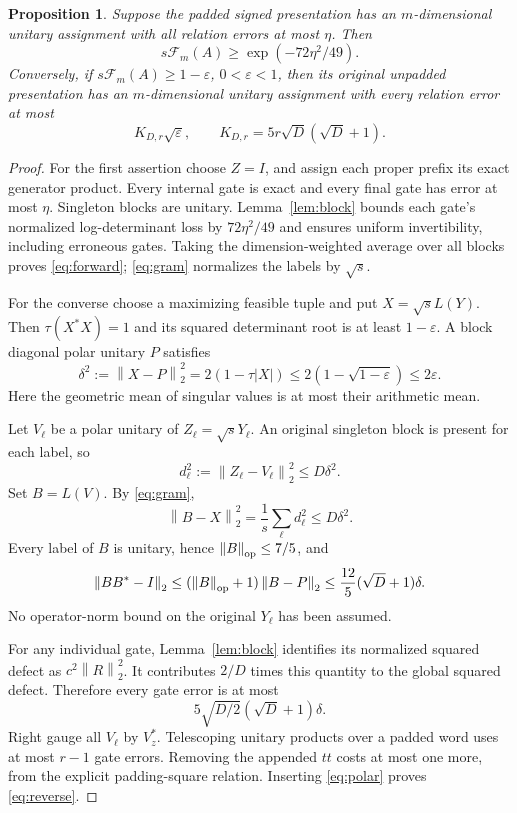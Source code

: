\documentclass[11pt]{article}
\newtheorem{proposition}[theorem]{Proposition}
\newcommand{\F}{\mathcal F}
\newcommand{\norm}[1]{\left\lVert#1\right\rVert}
\begin{document}
\begin{proposition}\label{prop:quantitative}
Suppose the padded signed presentation has an $m$-dimensional unitary assignment with all relation errors at most $\eta$. Then
\begin{equation}
 s\F_m(A)\ge \exp(-72\eta^2/49). \label{eq:forward}
\end{equation}
Conversely, if $s\F_m(A)\ge1-\varepsilon$, $0<\varepsilon<1$, then its original unpadded presentation has an $m$-dimensional unitary assignment with every relation error at most
\begin{equation}
 K_{D,r}\sqrt{\varepsilon},\qquad
 K_{D,r}=5r\sqrt D(\sqrt D+1). \label{eq:reverse}
\end{equation}
\end{proposition}
\begin{proof}
For the first assertion choose $Z=I$, and assign each proper prefix its exact generator product. Every internal gate is exact and every final gate has error at most $\eta$. Singleton blocks are unitary. Lemma~\ref{lem:block} bounds each gate's normalized log-determinant loss by $72\eta^2/49$ and ensures uniform invertibility, including erroneous gates. Taking the dimension-weighted average over all blocks proves \eqref{eq:forward}; \eqref{eq:gram} normalizes the labels by $\sqrt{s}$.

For the converse choose a maximizing feasible tuple and put $X=\sqrt{s}L(Y)$. Then $\tau(X^*X)=1$ and its squared determinant root is at least $1-\varepsilon$. A block diagonal polar unitary $P$ satisfies
\begin{equation}
 \delta^2:=\norm{X-P}_2^2
 =2(1-\tau|X|)
 \le2(1-\sqrt{1-\varepsilon})\le2\varepsilon. \label{eq:polar}
\end{equation}
Here the geometric mean of singular values is at most their arithmetic mean.

Let $V_\ell$ be a polar unitary of $Z_\ell=\sqrt{s}Y_\ell$. An original singleton block is present for each label, so
\[
 d_\ell^2:=\norm{Z_\ell-V_\ell}_2^2\le D\delta^2.
\]
Set $B=L(V)$. By \eqref{eq:gram},
\[
 \norm{B-X}_2^2=\frac1s\sum_\ell d_\ell^2\le D\delta^2.
\]
Every label of $B$ is unitary, hence $\norm B_{\rm op}\le7/5$, and
\[
 \norm{BB^*-I}_2
 \le(\norm B_{\rm op}+1)\norm{B-P}_2
 \le\frac{12}{5}(\sqrt D+1)\delta.
\]
No operator-norm bound on the original $Y_\ell$ has been assumed.

For any individual gate, Lemma~\ref{lem:block} identifies its normalized squared defect as $c^2\norm R_2^2$. It contributes $2/D$ times this quantity to the global squared defect. Therefore every gate error is at most
\[
 5\sqrt{D/2}(\sqrt D+1)\delta.
\]
Right gauge all $V_\ell$ by $V_z^*$. Telescoping unitary products over a padded word uses at most $r-1$ gate errors. Removing the appended $tt$ costs at most one more, from the explicit padding-square relation. Inserting \eqref{eq:polar} proves \eqref{eq:reverse}.
\end{proof}
\end{document}
